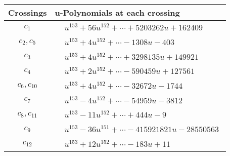 \documentclass[1p]{elsarticle_modified}
\theoremstyle{definition}
\begin{document}
\begin{tabular}{m{50pt}|m{274pt}}
Crossings & \hspace{64pt}u-Polynomials at each crossing \\
\hline $$\begin{aligned}c_{1}\end{aligned}$$&$\begin{aligned}
&u^{153}+56 u^{152}+\cdots+5203262 u+162409
\end{aligned}$\\
\hline $$\begin{aligned}c_{2},c_{5}\end{aligned}$$&$\begin{aligned}
&u^{153}+4 u^{152}+\cdots-1308 u-403
\end{aligned}$\\
\hline $$\begin{aligned}c_{3}\end{aligned}$$&$\begin{aligned}
&u^{153}+4 u^{152}+\cdots+3298135 u+149921
\end{aligned}$\\
\hline $$\begin{aligned}c_{4}\end{aligned}$$&$\begin{aligned}
&u^{153}+2 u^{152}+\cdots-590459 u+127561
\end{aligned}$\\
\hline $$\begin{aligned}c_{6},c_{10}\end{aligned}$$&$\begin{aligned}
&u^{153}+4 u^{152}+\cdots-32672 u-1744
\end{aligned}$\\
\hline $$\begin{aligned}c_{7}\end{aligned}$$&$\begin{aligned}
&u^{153}-4 u^{152}+\cdots-54959 u-3812
\end{aligned}$\\
\hline $$\begin{aligned}c_{8},c_{11}\end{aligned}$$&$\begin{aligned}
&u^{153}-11 u^{152}+\cdots+444 u-9
\end{aligned}$\\
\hline $$\begin{aligned}c_{9}\end{aligned}$$&$\begin{aligned}
&u^{153}-36 u^{151}+\cdots-415921821 u-28550563
\end{aligned}$\\
\hline $$\begin{aligned}c_{12}\end{aligned}$$&$\begin{aligned}
&u^{153}+12 u^{152}+\cdots-183 u+11
\end{aligned}$\\
\hline
\end{tabular}\\~\\
\end{document}
